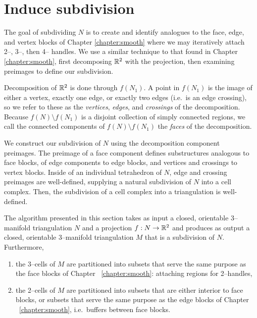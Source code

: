 \section{Induce subdivision}

The goal of subdividing $N$ is to create and identify analogues to the face, edge, and vertex blocks of Chapter \ref{chapter:smooth} where we may iteratively attach 2--, 3--, then 4-- handles.
We use a similar technique to that found in Chapter \ref{chapter:smooth}, first decomposing $\mathbb{R}^2$ with the projection, then examining preimages to define our subdivision.

Decomposition of $\mathbb{R}^2$ is done through $f(N_1)$.
A point in $f(N_1)$ is the image of either a vertex, exactly one edge, or exactly two edges (i.e.\ is an edge crossing), so we refer to these as the \emph{vertices}, \emph{edges}, and \emph{crossings} of the decomposition.
Because $f(N)\setminus f(N_1)$  is a disjoint collection of simply connected regions, we call the connected components of $f(N)\setminus f(N_1)$ the \emph{faces} of the decomposition.

We construct our subdivision of $N$ using the decomposition component preimages.
The preimage of a face component defines substructures analogous to face blocks, of edge components to edge blocks, and vertices and crossings to vertex blocks.
Inside of an individual tetrahedron of $N$, edge and crossing preimages are well-defined, supplying a natural subdivision of $N$ into a cell complex.
Then, the subdivision of a cell complex into a triangulation is well-defined.

The algorithm presented in this section takes as input a closed, orientable 3--manifold triangulation $N$ and a projection $f:N\to\mathbb{R}^2$ and produces as output a closed, orientable 3--manifold triangulation $M$ that is a subdivision of $N$.
Furthermore,
\begin{enumerate}
	\item the 3--cells of $M$ are partitioned into subsets that serve the same purpose as the face blocks of Chapter ~\ref{chapter:smooth}: attaching regions for 2--handles,
	\item the 2--cells of $M$ are partitioned into subsets that are either interior to face blocks, or subsets that serve the same purpose as the edge blocks of Chapter ~\ref{chapter:smooth}, i.e.\ buffers between face blocks.	
\end{enumerate}
